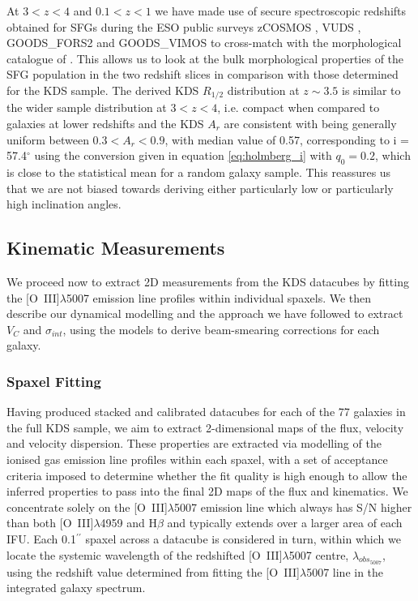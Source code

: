 \documentclass[fleqn,usenatbib]{mn2e}
\begin{document}
At $3 < z < 4$ and $0.1 < z < 1$ we have made use of secure spectroscopic redshifts obtained for SFGs during the ESO public surveys zCOSMOS \citep{Lilly2007}, VUDS \citep{Tasca2016}, GOODS\_FORS2 \citep{Vanzella2005,Vanzella2006,Vanzella2008} and GOODS\_VIMOS \citep{Balestra2010} to cross-match with the morphological catalogue of \cite{VanderWel2012}.
This allows us to look at the bulk morphological properties of the SFG population in the two redshift slices in comparison with those determined for the KDS sample.
The derived KDS $R_{1/2}$ distribution at $z \sim 3.5$ is similar to the wider sample distribution at $3 < z  < 4$, i.e. compact when compared to galaxies at lower redshifts and the KDS $A_{r}$ are consistent with being generally uniform between $0.3 < A_{r} < 0.9$, with median value of 0.57, corresponding to i = 57.4$^{\circ}$ using the conversion given in equation \ref{eq:holmberg_i} with $q_{0}=0.2$, which is close to the statistical mean for a random galaxy sample.
This reassures us that we are not biased towards deriving either particularly low or particularly high inclination angles.

\subsection{Kinematic Measurements}\label{subsection:kinematic_measurements}

We proceed now to extract 2D measurements from the KDS datacubes by fitting the [O~{\sc III}]$\lambda$5007 emission line profiles within individual spaxels.
We then describe our dynamical modelling and the approach we have followed to extract $V_{C}$ and $\sigma_{int}$, using the models to derive beam-smearing corrections for each galaxy.  

\subsubsection{Spaxel Fitting}\label{subsubsection:spaxel_fitting}
Having produced stacked and calibrated datacubes for each of the 77 galaxies in the full KDS sample, we aim to extract 2-dimensional maps of the flux, velocity and velocity dispersion.
These properties are extracted via modelling of the ionised gas emission line profiles within each spaxel, with a set of acceptance criteria imposed to determine whether the fit quality is high enough to allow the inferred properties to pass into the final 2D maps of the flux and kinematics.
We concentrate solely on the [O~{\sc III}]$\lambda$5007 emission line which always has S/N higher than both [O~{\sc III}]$\lambda$4959 and H$\beta$ and typically extends over a larger area of each IFU.
Each 0.1$^{\prime\prime}$ spaxel across a datacube is considered in turn, within which we locate the systemic wavelength of the redshifted [O~{\sc III}]$\lambda$5007 centre, $\lambda_{obs_{5007}}$, using the redshift value determined from fitting the [O~{\sc III}]$\lambda$5007 line in the integrated galaxy spectrum.
\end{document}
